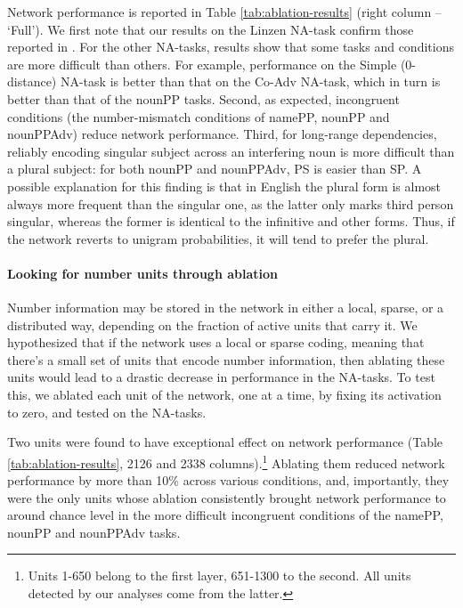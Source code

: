 Network performance is reported in Table \ref{tab:ablation-results}
(right column -- `Full'). We first note that our results on the Linzen NA-task confirm those reported in . For the other NA-tasks, results show that some tasks and
conditions are more difficult than others. For example, performance on
the Simple (0-distance) NA-task is better than that on the Co-Adv
NA-task, which in turn is better than that of the nounPP
tasks. Second, as expected, incongruent conditions (the
number-mismatch conditions of namePP, nounPP and nounPPAdv) reduce
network performance. Third, for long-range dependencies, reliably
encoding singular subject across an interfering noun is more difficult
than a plural subject: for both nounPP and nounPPAdv, PS is easier
than SP. A possible explanation for this finding is that in English the plural form is
almost always more frequent than the singular one, as the latter only
marks third person singular, whereas the former is identical to the
infinitive and other forms. Thus, if the network reverts to unigram
probabilities, it will tend to prefer the plural. 

\paragraph{Looking for number units through ablation} Number
information may be stored in the network in either a local, sparse, or
a distributed way, depending on the fraction of active units that
carry it.  We hypothesized that if the network uses a local or sparse
coding, meaning that there's a small set of units that encode number
information, then ablating these units would lead to a drastic
decrease in performance in the NA-tasks.  To test this, we ablated
each unit of the network, one at a time, by fixing its activation to zero,
and tested on the NA-tasks.

Two units were found to have exceptional effect on network performance
(Table \ref{tab:ablation-results}, \unit{2}{126} and \unit{2}{338}
columns).\footnote{Units 1-650 belong to the first layer, 651-1300 to
  the second. All units detected by our analyses come from the latter.} Ablating them reduced network performance by more than 10\%
across various conditions, and, importantly, they were the only units
whose ablation consistently brought network performance to around
chance level in the more difficult incongruent conditions of the
namePP, nounPP and nounPPAdv
tasks. 

